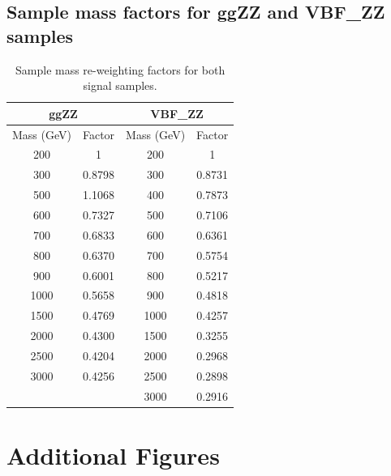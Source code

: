 \section{Sample mass factors for ggZZ and VBF\_ZZ samples}
\label{apdx:mass_wgts}
\begin{table}[]
    \centering
\begin{tabular}{|c|c|c|c|}
\hline
\multicolumn{2}{|c|}{ggZZ} & \multicolumn{2}{c|}{VBF\_ZZ} \\ \hline
Mass (GeV)     & Factor    & Mass (GeV)      & Factor     \\ \hline
200            & 1         & 200             & 1          \\ \hline
300            & 0.8798    & 300             & 0.8731     \\ \hline
500            & 1.1068    & 400             & 0.7873     \\ \hline
600            & 0.7327    & 500             & 0.7106     \\ \hline
700            & 0.6833    & 600             & 0.6361     \\ \hline
800            & 0.6370    & 700             & 0.5754     \\ \hline
900            & 0.6001    & 800             & 0.5217     \\ \hline
1000           & 0.5658    & 900             & 0.4818     \\ \hline
1500           & 0.4769    & 1000            & 0.4257     \\ \hline
2000           & 0.4300    & 1500            & 0.3255     \\ \hline
2500           & 0.4204    & 2000            & 0.2968     \\ \hline
3000           & 0.4256    & 2500            & 0.2898     \\ \hline
               &           & 3000            & 0.2916     \\ \hline
\end{tabular}
\caption{Sample mass re-weighting factors for both signal samples.}
\end{table}

\chapter{Additional Figures}
\pagebreak
